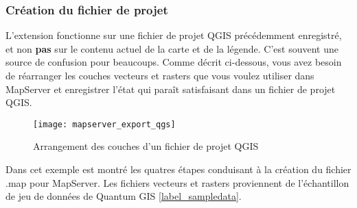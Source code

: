 \subsubsection{Cr\'eation du fichier de projet}

L'extension fonctionne sur une fichier de projet QGIS pr\'ec\'edemment enregistr\'e, et non \textbf{pas} sur le contenu actuel de la carte et de la l\'egende. C'est souvent une source de confusion pour beaucoups. Comme d\'ecrit ci-dessous, vous avez besoin de r\'earranger les couches vecteurs et rasters que vous voulez utiliser dans MapServer et enregistrer l'\'etat qui para\^it satisfaisant dans un fichier de projet QGIS.


\begin{figure}[ht]
\begin{center}
  \caption{Arrangement des couches d'un fichier de projet QGIS \nixcaption}
  \label{fig:mapserver_export_qgs}\smallskip
  \texttt{[image: mapserver\_export\_qgs]}
\end{center}
\end{figure}


Dans cet exemple est montr\'e les quatres \'etapes conduisant \`a la cr\'eation du fichier .map pour MapServer. Les fichiers vecteurs et rasters proviennent de l'\'echantillon de jeu de donn\'ees de Quantum GIS \ref{label_sampledata}.


